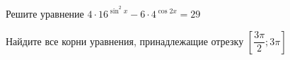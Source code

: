 \begin{ex}
	\begin{condition}
		\begin{enumcols}[label=\asbuk*)]
			\item Решите уравнение \( 4\cdot16^{\sin^2 x } - 6\cdot4^{\cos 2x}  = 29 \)
			\item Найдите все корни уравнения, принадлежащие отрезку \( \left[\dfrac{3\pi}{2};3\pi\right] \)
		\end{enumcols}
	\end{condition}
\end{ex}
